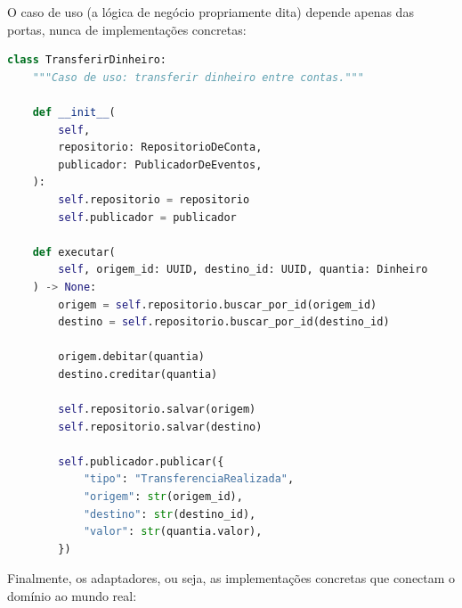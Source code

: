 O caso de uso (a lógica de negócio propriamente dita) depende apenas das portas,
nunca de implementações concretas:

\begin{lstlisting}[language=Python, caption={Caso de Uso -- Transferência Bancária}]
class TransferirDinheiro:
    """Caso de uso: transferir dinheiro entre contas."""

    def __init__(
        self,
        repositorio: RepositorioDeConta,
        publicador: PublicadorDeEventos,
    ):
        self.repositorio = repositorio
        self.publicador = publicador

    def executar(
        self, origem_id: UUID, destino_id: UUID, quantia: Dinheiro
    ) -> None:
        origem = self.repositorio.buscar_por_id(origem_id)
        destino = self.repositorio.buscar_por_id(destino_id)

        origem.debitar(quantia)
        destino.creditar(quantia)

        self.repositorio.salvar(origem)
        self.repositorio.salvar(destino)

        self.publicador.publicar({
            "tipo": "TransferenciaRealizada",
            "origem": str(origem_id),
            "destino": str(destino_id),
            "valor": str(quantia.valor),
        })
\end{lstlisting}

Finalmente, os adaptadores, ou seja, as implementações concretas que conectam o domínio
ao mundo real:

